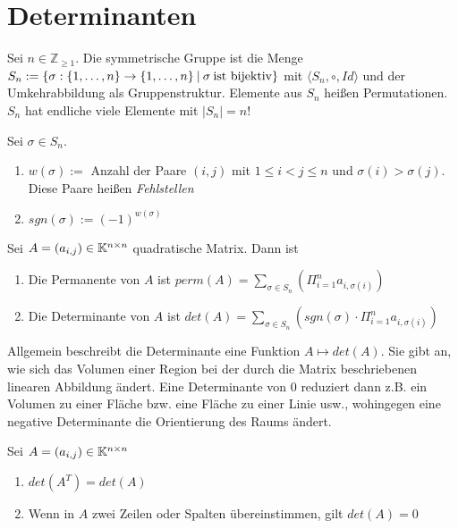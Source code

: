 \section{Determinanten} 

\begin{definition}
	Sei $n \in \mathbb{Z}_{\geq 1}$. Die symmetrische Gruppe ist die Menge $S_n := \{ \sigma : \{ 1, \dots, n \} \rightarrow \{1, \dots, n\} \medspace | \medspace \sigma \medspace \textnormal{ist bijektiv}  \}$ mit $\langle S_n, \circ, Id \rangle$ und der Umkehrabbildung als Gruppenstruktur. Elemente aus $S_n$ heißen Permutationen. $S_n$ hat endliche viele Elemente mit $|S_n| = n!$
\end{definition}

\begin{definition}
	Sei $\sigma \in S_n$.
	\begin{enumerate}[noitemsep]
		\item $w(\sigma) := $ Anzahl der Paare $(i,j)$ mit $1 \leq i < j \leq n$ und $\sigma(i) > \sigma(j)$. Diese Paare heißen \emph{Fehlstellen}
		\item $sgn(\sigma) := (-1)^{w(\sigma)}$
	\end{enumerate}
\end{definition}

\begin{definition}
	Sei $A = (a_{i,j}) \in \mathbb{K}^{n \times n}$ quadratische Matrix. Dann ist
	\begin{enumerate}[noitemsep]
		\item Die Permanente von $A$ ist $perm(A) = \sum_{\sigma \in S_n}(\Pi_{i=1}^n a_ {i, \sigma(i)})$
		\item Die Determinante von $A$ ist $det(A) = \sum_{\sigma \in S_n}(sgn(\sigma) \cdot \Pi_{i=1}^n a_ {i, \sigma(i)})$		
	\end{enumerate}
	Allgemein beschreibt die Determinante eine Funktion $A \mapsto det(A)$. Sie gibt an, wie sich das Volumen einer Region bei der durch die Matrix beschriebenen linearen Abbildung ändert. Eine Determinante von 0 reduziert dann z.B. ein Volumen zu einer Fläche bzw. eine Fläche zu einer Linie usw., wohingegen eine negative Determinante die Orientierung des Raums ändert.
\end{definition}

\begin{satz}
	Sei $A = (a_{i,j}) \in \mathbb{K}^{n \times n}$
	\begin{enumerate}[noitemsep]
		\item $det(A^T) = det(A)$
		\item Wenn in $A$ zwei Zeilen oder Spalten übereinstimmen, gilt $det(A) = 0$
	\end{enumerate}
\end{satz}

